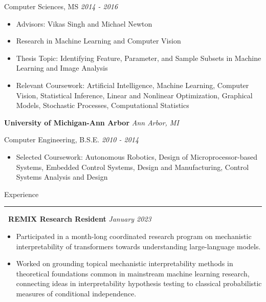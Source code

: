 \documentclass[]{article}
\begin{document}
	{Computer Sciences, MS \hfill \textit{2014 - 2016}}
	
	\vspace{-5pt}
	\begin{itemize}[label={$\bullet$}]
		\item Advisors: Vikas Singh and Michael Newton
		\item Research in Machine Learning and Computer Vision
		\item Thesis Topic: Identifying Feature, Parameter, and Sample Subsets in Machine Learning and Image Analysis
		\item Relevant Coursework: Artificial Intelligence,  Machine Learning, Computer Vision, Statistical Inference, Linear and Nonlinear Optimization, Graphical Models, Stochastic Processes, Computational Statistics
	\end{itemize}
 {{\bf\large University of Michigan-Ann Arbor} \hfill \textit{Ann Arbor, MI} }
 
	{ Computer Engineering, B.S.E. \hfill \textit{2010 - 2014} }
	
	\vspace{-5pt}
	\begin{itemize}[label={$\bullet$}]
		\item Selected Coursework: Autonomous Robotics, Design of Microprocessor-based Systems, Embedded Control Systems, Design and Manufacturing, Control Systems Analysis and Design
	\end{itemize}

\vspace{15pt}
{\LARGE Experience}
\hrule
\vspace{10pt}

 \newline
{\bf \ REMIX Research Resident} \hfill \textit{January 2023}
\begin{itemize}[label={$\bullet$}]
	\item Participated in a month-long coordinated research program on mechanistic interpretability of transformers towards understanding large-language models.
	\item Worked on grounding topical mechanistic interpretability methods in theoretical foundations common in mainstream machine learning research, connecting ideas in interpretability hypothesis testing to classical probabilistic measures of conditional independence.
\end{itemize} 
\end{document}
